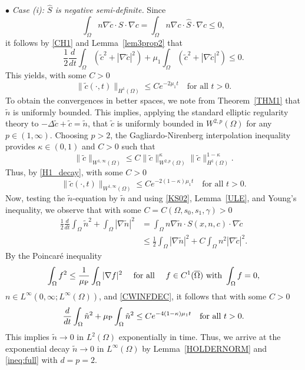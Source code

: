 \documentclass{amsart}
\numberwithin{equation}{section}
\newenvironment{pfthm3}{{\par\noindent\bf
           Proof of Theorem~\ref{THM3}. }}{\hfill\fbox{}\par\vspace{.2cm}}
\begin{document}
\begin{pfthm3}
$\bullet$ \emph{Case (i): $\hat{S}$ is negative semi-definite.}   Since 
\[
\int_{\Omega} n\nabla \tilde{c}\cdot S \cdot \nabla  c  = \int_{\Omega} n\nabla  c \cdot \hat{S} \cdot \nabla  c \le 0,
\]
it follows by \eqref{CH1} and Lemma~\ref{lem3prop2} that
\[
\frac{1}{2}\frac{d}{dt}\int_{\Omega}( \tilde{c}^{2}+|\nabla \tilde{c}|^{2})+\mu_{1}\int_{\Omega}( \tilde{c}^{2}+|\nabla \tilde{c}|^{2}) \le 0.
\]
This yields, with some $C>0$
\begin{equation}\label{H1_decay}
\|\tilde{c}(\cdot, t) \|_{H^1(\Omega)} \le C  e^{-2\mu_{1}t} \quad \text{for all } t > 0.
\end{equation}
To obtain the convergences in better spaces, we note from Theorem~\ref{THM1} that $\tilde{n}$ is uniformly bounded. This implies, applying the standard elliptic regularity theory to $-\Delta \tilde{c} + \tilde{c} = \tilde{n}$, that $\tilde{c}$ is uniformly bounded in $W^{2,p}(\Omega)$ for any $p \in (1, \infty)$. Choosing $p > 2$, the Gagliardo-Nirenberg interpolation inequality provides $\kappa \in (0, 1)$ and $C > 0$ such that
\[
\|\tilde{c}\|_{W^{1,\infty}(\Omega)} \le C \|\tilde{c}\|_{W^{2,p}(\Omega)}^\kappa \|\tilde{c}\|_{H^1(\Omega)}^{1-\kappa}.
\]
Thus, by \eqref{H1_decay}, with some $C>0$
\begin{equation}\label{CWINFDEC}
\|\tilde{c}(\cdot, t)  \|_{W^{1,\infty}(\Omega)}\le C  e^{-2(1-\kappa)\mu_{1}t} \quad \text{for all } t > 0.
\end{equation}
Now, testing the $\tilde{n}$-equation by $\tilde{n}$ and using \eqref{KS02}, Lemma~\ref{ULE}, and Young's inequality, we observe that with some $C=C(\Omega, s_{0},s_{1},\gamma)>0$
\[
\begin{aligned}
\frac{1}{2}\frac{d}{dt}\int_{\Omega}\tilde{n}^{2}+\int_{\Omega}|\nabla \tilde{n}|^{2}&=\int_{\Omega} n \nabla \tilde{n}\cdot S(x,n,c)\cdot \nabla  \tilde{c}
\\&\le \frac{1}{2}\int_{\Omega}|\nabla \tilde{n}|^{2}+C\int_{\Omega}n^{2}|\nabla \tilde{c}|^{2}.
\end{aligned}
\]
By the Poincar\'e inequality
\[
\int_{\Omega}  f ^{2} \le \frac{1}{\mu_{\rm P}}\int_{\Omega}|\nabla f|^{2}\quad \mbox{ for all }\quad f\in C^{1}(\overline{\Omega}) \mbox{ with } \int_{\Omega}f=0,
\]
$n\in L^{\infty}(0,\infty;L^{\infty}(\Omega))$, and \eqref{CWINFDEC}, it follows that with some $C>0$
\[
\frac{d}{dt}\int_{\Omega}\tilde{n}^{2}+\mu_{\rm P}\int_{\Omega}   \tilde{n} ^{2}\le C e^{-4(1-\kappa)\mu_{1}t}\quad \text{for all } t > 0.
\]
This implies $\tilde{n} \rightarrow 0$ in $L^{2}(\Omega)$ exponentially in time. Thus, we arrive at the exponential decay  $\tilde{n} \rightarrow 0$ in $L^{\infty}(\Omega)$ by Lemma~\ref{HOLDERNORM} and \eqref{ineq:full} with $d=p=2$.
 


\end{pfthm3}
\end{document}
